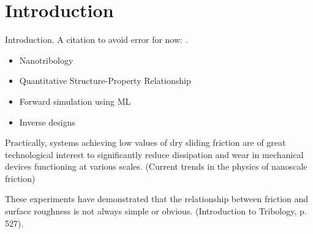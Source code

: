 \chapter*{Introduction}
Introduction. A citation to avoid error for now: \cite{li_evolving_2016}.

\begin{itemize}
    \item Nanotribology
    \item Quantitative Structure-Property Relationship
    \item Forward simulation using ML
    \item Inverse designs
\end{itemize}


Practically, systems achieving low values of dry sliding friction are of great technological interest to significantly reduce dissipation and wear in mechanical devices functioning at various scales. (Current trends in the physics of nanoscale friction)

These experiments have demonstrated that the relationship between friction and surface roughness is not always simple or obvious. (Introduction to Tribology, p. 527).


